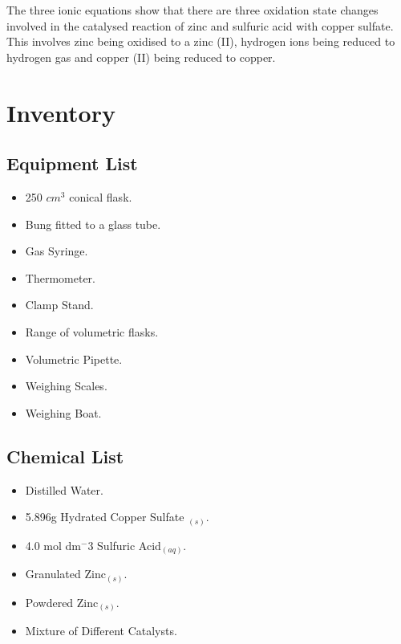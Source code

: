 The three ionic equations show that there are three oxidation state changes involved in the catalysed reaction of zinc and sulfuric acid with copper sulfate. This involves zinc being oxidised to a zinc (II), hydrogen ions being reduced to hydrogen gas and copper (II) being reduced to copper.










































\section{Inventory}

	\subsection{Equipment List}
\begin{itemize}
\item 250 $cm^3$ conical flask.
\item Bung fitted to a glass tube.
\item Gas Syringe.
\item Thermometer.
\item Clamp Stand.
\item Range of volumetric flasks.
\item Volumetric Pipette.
\item Weighing Scales.
\item Weighing Boat.
\end{itemize}

	\subsection{Chemical List}
\begin{itemize}
\item Distilled Water.
\item 5.896g Hydrated Copper Sulfate $_{(s)}$.
\item 4.0 mol dm$^-3$ Sulfuric Acid$_{(aq)}$.
\item Granulated Zinc$_{(s)}$.
\item Powdered Zinc$_{(s)}$.
\item Mixture of Different Catalysts.
\end{itemize}






